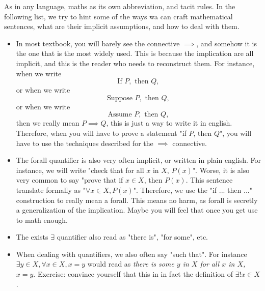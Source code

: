 As in any language, maths as its own abbreviation, and tacit rules. In the following list, we try to hint some of the ways wa can craft mathematical sentences, what are their implicit assumptions, and how to deal with them.
\begin{itemize}
    \item In most textbook, you will barely see the connective \( \implies \), and somehow it is the one that is the most widely used. This is because the implication are all implicit, and this is the reader who needs to reconstruct them. For instance, when we write
    \begin{equation*}
        \text{If } P, \text{ then }Q,
    \end{equation*}
    or when we write
    \begin{equation*}
        \text{Suppose } P, \text{ then }Q,
    \end{equation*}
    or when we write
    \begin{equation*}
        \text{Assume } P, \text{ then }Q,
    \end{equation*}
    then we really mean \( P \implies Q \), this is just a way to write it in english. Therefore, when you will have to prove a statement "if \( P \), then \( Q \)", you will have to use the techniques described for the \( \implies \) connective.

    \item The forall quantifier is also very often implicit, or written in plain english. For instance, we will write "check that for all \( x \) in \( X \), \( P(x) \)". Worse, it is also very common to say "prove that if \( x \in X \), then \( P(x) \). This sentence translate formally as "\( \forall x \in X, P(x) \)". Therefore, we use the "if ... then ..." construction to really mean a forall. This means no harm, as forall is secretly a generalization of the implication. Maybe you will feel that once you get use to math enough. 
    
    \item The exists \( \exists \) quantifier also read as "there is", "for some", etc.
    
    \item When dealing with quantifiers, we also often say "such that". For instance \( \exists y \in X, \forall x \in X, x = y \) would read as \textit{there is some \( y \) in \( X \)  for all \( x \) in \( X \), \( x = y \)}. Exercise: convince yourself that this in in fact the definition of \( \exists! x \in X \). 
    

\end{itemize}
